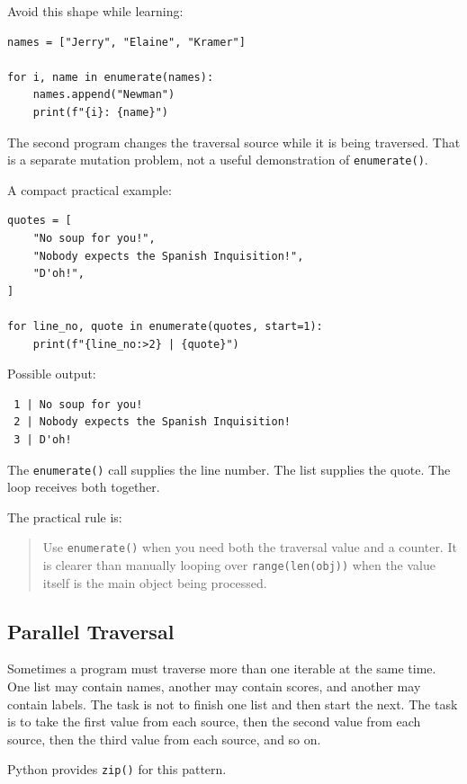 \documentclass[a4paper,twoside]{report}
\begin{document}
Avoid this shape while learning:

\begin{verbatim}
names = ["Jerry", "Elaine", "Kramer"]

for i, name in enumerate(names):
    names.append("Newman")
    print(f"{i}: {name}")
\end{verbatim}

The second program changes the traversal source while it is being traversed. That is a separate mutation problem, not a useful demonstration of \texttt{enumerate()}.

A compact practical example:

\begin{verbatim}
quotes = [
    "No soup for you!",
    "Nobody expects the Spanish Inquisition!",
    "D'oh!",
]

for line_no, quote in enumerate(quotes, start=1):
    print(f"{line_no:>2} | {quote}")
\end{verbatim}

Possible output:

\begin{verbatim}
 1 | No soup for you!
 2 | Nobody expects the Spanish Inquisition!
 3 | D'oh!
\end{verbatim}

The \texttt{enumerate()} call supplies the line number. The list supplies the quote. The loop receives both together.

The practical rule is:

\begin{quote}
Use \texttt{enumerate()} when you need both the traversal value and a counter. It is clearer than manually looping over \texttt{range(len(obj))} when the value itself is the main object being processed.
\end{quote}

\subsection{Parallel Traversal}

Sometimes a program must traverse more than one iterable at the same time. One list may contain names, another may contain scores, and another may contain labels. The task is not to finish one list and then start the next. The task is to take the first value from each source, then the second value from each source, then the third value from each source, and so on.

Python provides \texttt{zip()} for this pattern.
\end{document}

